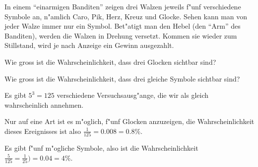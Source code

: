 In einem ``einarmigen Banditen'' zeigen drei Walzen jeweils f"unf
verschiedene Symbole an, n"amlich Caro, Pik, Herz, Kreuz und Glocke.
Sehen kann man von jeder Walze immer nur ein Symbol.
Bet"atigt man den Hebel (den ``Arm'' des Banditen),
werden die Walzen in Drehung versetzt. Kommen sie wieder zum Stillstand,
wird je nach Anzeige ein Gewinn ausgezahlt.
\begin{teilaufgaben}
\item
Wie gross ist die Wahrscheinlichkeit, dass drei Glocken sichtbar sind?
\item
Wie gross ist die Wahrscheinlichkeit, dass drei gleiche Symbole
sichtbar sind?
\end{teilaufgaben}

\begin{loesung}
Es gibt $5^3=125$ verschiedene Versuchsausg"ange, die wir als gleich
wahrscheinlich annehmen.
\begin{teilaufgaben}
\item Nur auf eine Art ist es m"oglich, f"unf Glocken anzuzeigen, die
Wahrscheinlichkeit dieses Ereignisses ist also $\frac1{125}=0.008=0.8\%$.
\item Es gibt f"unf m"ogliche Symbole, also ist die Wahrscheinlichkeit
$\frac{5}{125}=\frac1{25})=0.04=4\%$.
\end{teilaufgaben}
\end{loesung}

